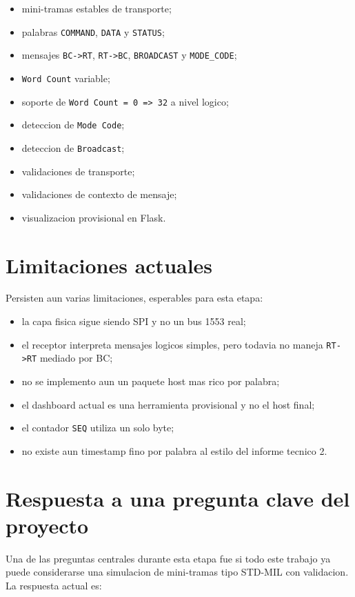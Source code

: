 \documentclass[12pt,a4paper]{article}
\begin{document}
\begin{itemize}
    \item mini-tramas estables de transporte;
    \item palabras \texttt{COMMAND}, \texttt{DATA} y \texttt{STATUS};
    \item mensajes \texttt{BC->RT}, \texttt{RT->BC}, \texttt{BROADCAST} y \texttt{MODE\_CODE};
    \item \texttt{Word Count} variable;
    \item soporte de \texttt{Word Count = 0 => 32} a nivel logico;
    \item deteccion de \texttt{Mode Code};
    \item deteccion de \texttt{Broadcast};
    \item validaciones de transporte;
    \item validaciones de contexto de mensaje;
    \item visualizacion provisional en Flask.
\end{itemize}

\section{Limitaciones actuales}

Persisten aun varias limitaciones, esperables para esta etapa:

\begin{itemize}
    \item la capa fisica sigue siendo SPI y no un bus 1553 real;
    \item el receptor interpreta mensajes logicos simples, pero todavia no maneja \texttt{RT->RT}
    mediado por BC;
    \item no se implemento aun un paquete host mas rico por palabra;
    \item el dashboard actual es una herramienta provisional y no el host final;
    \item el contador \texttt{SEQ} utiliza un solo byte;
    \item no existe aun timestamp fino por palabra al estilo del informe tecnico 2.
\end{itemize}

\section{Respuesta a una pregunta clave del proyecto}

Una de las preguntas centrales durante esta etapa fue si todo este trabajo ya puede considerarse
una simulacion de mini-tramas tipo STD-MIL con validacion. La respuesta actual es:
\end{document}
